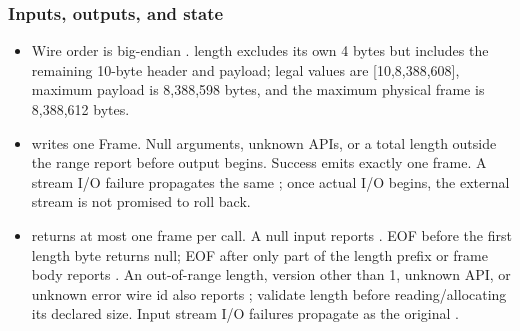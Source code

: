 \subsubsection*{Inputs, outputs, and state}
\begin{itemize}
\item Wire order is big-endian . length excludes its own 4 bytes but includes the remaining 10-byte header and payload; legal values are [10,8,388,608], maximum payload is 8,388,598 bytes, and the maximum physical frame is 8,388,612 bytes.
\item {} writes one Frame. Null arguments, unknown APIs, or a total length outside the range report  before output begins. Success emits exactly one frame. A stream I/O failure propagates the same ; once actual I/O begins, the external stream is not promised to roll back.
\item {} returns at most one frame per call. A null input reports . EOF before the first length byte returns null; EOF after only part of the length prefix or frame body reports . An out-of-range length, version other than 1, unknown API, or unknown error wire id also reports ; validate length before reading/allocating its declared size. Input stream I/O failures propagate as the original .
\end{itemize}
